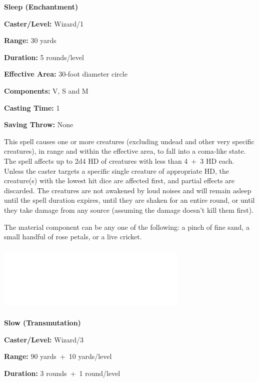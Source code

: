 \begin{multicols}{2}
\begin{minipage}{\columnwidth}
\noindent \textbf{Sleep (Enchantment)}

\noindent \textbf{Caster/Level:} Wizard/1

\noindent \textbf{Range:} 30 yards

\noindent \textbf{Duration:} 5 rounds/level

\noindent \textbf{Effective Area:} 30-foot diameter circle

\noindent \textbf{Components:} V, S and M

\noindent \textbf{Casting Time:} 1

\noindent \textbf{Saving Throw:} None

\end{minipage}

This spell causes one or more creatures (excluding undead and other very specific creatures), in range and within the effective area, to fall into a coma-like state.  The spell affects up to 2d4 HD of creatures with less than 4~+~3 HD each.  Unless the caster targets a specific single creature of appropriate HD, the creature(s) with the lowest hit dice are affected first, and partial effects are discarded.  The creatures are not awakened by loud noises and will remain asleep until the spell duration expires, until they are shaken for an entire round, or until they take damage from any source (assuming the damage doesn't kill them first).  

The material component can be any one of the following: a pinch of fine sand, a small handful of rose petals, or a live cricket.

\noindent\includegraphics[width=3.6in, height=1.25in]{testblock.pdf}

\vspace{1em}

\noindent
\begin{minipage}{\columnwidth}

\noindent \textbf{Slow (Transmutation)}

\noindent \textbf{Caster/Level:} Wizard/3

\noindent \textbf{Range:} 90 yards~+~10 yards/level

\noindent \textbf{Duration:} 3 rounds~+~1 round/level


\end{minipage}
\end{multicols}
